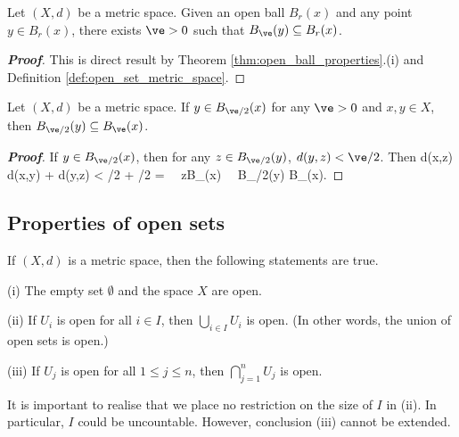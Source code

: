\begin{corollary}
Let $(X,d)$ be a metric space. Given an open ball $B_r(x)$ and any point $y\in B_r(x)$, there exists $\ve >0$ such that $B_{\ve}(y) \subseteq B_r(x)$.
\end{corollary}

\begin{proof}[\bf Proof]
This is direct result by Theorem \ref{thm:open_ball_properties}.(i) and Definition \ref{def:open_set_metric_space}.
\end{proof}

\begin{proposition}\label{pro:open_ball_triangle_inequality}
Let $(X,d)$ be a metric space. If $y\in B_{\ve/2}(x)$ for any $\ve >0$ and $x,y\in X$, then $B_{\ve/2}(y) \subseteq B_{\ve}(x)$.
\end{proposition}

\begin{proof}[\bf Proof]
If $y \in B_{\ve/2}(x)$, then for any $z\in B_{\ve/2}(y)$, $d(y,z)< \ve/2$. Then
\be
d(x,z) \leq d(x,y) + d(y,z) < \ve/2 + \ve/2 = \ve \ \ra\ z\in B_\ve(x) \ \ra\ B_{\ve/2}(y) \subseteq B_\ve(x).
\ee
\end{proof}

\subsection{Properties of open sets}

\begin{theorem}\label{thm:open_set_metric}
If $(X,d)$ is a metric space, then the following statements are true.
\ben
\item [(i)] The empty set $\emptyset$ and the space $X$ are open.
\item [(ii)] If $U_i$ is open for all $i\in I$, then $\bigcup_{i \in I} U_i$ is open. (In other words, the union of open sets is open.)
\item [(iii)] If $U_{j}$ is open for all $1\leq j\leq n$, then $\bigcap_{j=1}^{n} U_{j}$ is open.
\een
\end{theorem}

\begin{remark}
It is important to realise that we place no restriction on the size of $I$ in (ii). In particular, $I$ could be uncountable. However, conclusion (iii) cannot be extended.
\end{remark}



